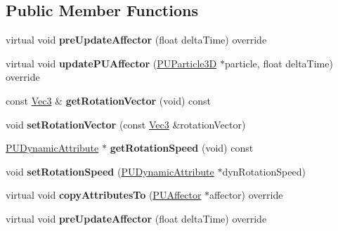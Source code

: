 \subsection*{Public Member Functions}
\begin{DoxyCompactItemize}
\item 
\mbox{\label{classPUVortexAffector_ae90815f0ee03beca220ca1f29b4c91cb}} 
virtual void {\bfseries pre\+Update\+Affector} (float delta\+Time) override
\item 
\mbox{\label{classPUVortexAffector_a73d2bf4fcbc4e254fea15cd90d89c8ce}} 
virtual void {\bfseries update\+P\+U\+Affector} (\hyperlink{structPUParticle3D}{P\+U\+Particle3D} $\ast$particle, float delta\+Time) override
\item 
\mbox{\label{classPUVortexAffector_ac36ecb5b2828069aba6c50c11f20f549}} 
const \hyperlink{classVec3}{Vec3} \& {\bfseries get\+Rotation\+Vector} (void) const
\item 
\mbox{\label{classPUVortexAffector_a715351b9c83fa5affb6e49cdbb467f87}} 
void {\bfseries set\+Rotation\+Vector} (const \hyperlink{classVec3}{Vec3} \&rotation\+Vector)
\item 
\mbox{\label{classPUVortexAffector_a7154624539f6865095bcd93c93a0f9d8}} 
\hyperlink{classPUDynamicAttribute}{P\+U\+Dynamic\+Attribute} $\ast$ {\bfseries get\+Rotation\+Speed} (void) const
\item 
\mbox{\label{classPUVortexAffector_ad5f124d204aa77d03a0bacf664b56f2c}} 
void {\bfseries set\+Rotation\+Speed} (\hyperlink{classPUDynamicAttribute}{P\+U\+Dynamic\+Attribute} $\ast$dyn\+Rotation\+Speed)
\item 
\mbox{\label{classPUVortexAffector_a57c77c32f8cbc3edbfc823d36139457d}} 
virtual void {\bfseries copy\+Attributes\+To} (\hyperlink{classPUAffector}{P\+U\+Affector} $\ast$affector) override
\item 
\mbox{\label{classPUVortexAffector_a59be57dd0f6cf59d686b6bd550da79f8}} 
virtual void {\bfseries pre\+Update\+Affector} (float delta\+Time) override

\end{DoxyCompactItemize}
